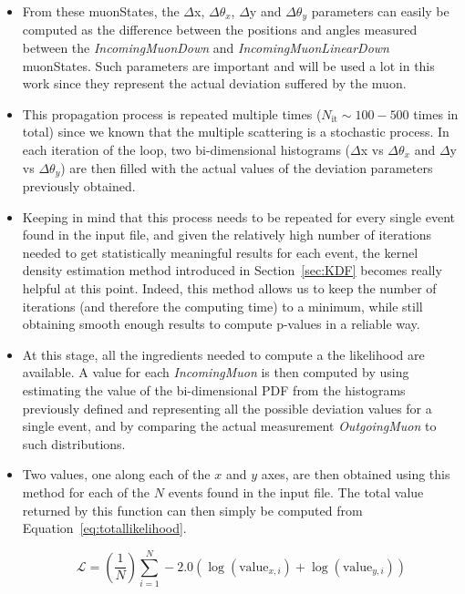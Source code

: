\documentclass[a4paper, 11pt, twoside, openright]{report}
\begin{document}
\begin{itemize}
\item From these muonStates, the $\Delta$x, $\Delta \theta_x$, $\Delta$y and $\Delta \theta_y$ parameters can easily be computed as the difference between the positions and angles measured between the \textit{IncomingMuonDown} and \textit{IncomingMuonLinearDown} muonStates. Such parameters are important and will be used a lot in this work since they represent the actual deviation suffered by the muon.
\item This propagation process is repeated multiple times ($N_{\text{it}} \sim 100-500$ times in total) since we known that the multiple scattering is a stochastic process. In each iteration of the loop, two bi-dimensional histograms ($\Delta$x vs $\Delta \theta_x$ and $\Delta$y vs $\Delta \theta_y$) are then filled with the actual values of the deviation parameters previously obtained.
\item Keeping in mind that this process needs to be repeated for every single event found in the input file, and given the relatively high number of iterations needed to get statistically meaningful results for each event, the kernel density estimation method introduced in Section~\ref{sec:KDF} becomes really helpful at this point. Indeed, this method allows us to keep the number of iterations (and therefore the computing time) to a minimum, while still obtaining smooth enough results to compute p-values in a reliable way.
\item At this stage, all the ingredients needed to compute a the likelihood are available. A value for each \textit{IncomingMuon} is then computed by using estimating the value of the bi-dimensional PDF from the histograms previously defined and representing all the possible deviation values for a single event, and by comparing the actual measurement \textit{OutgoingMuon} to such distributions.
\item Two values, one along each of the $x$ and $y$ axes, are then obtained using this method for each of the $N$ events found in the input file. The total value returned by this function can then simply be computed from Equation~\ref{eq:totallikelihood}.

\begin{equation}
\label{eq:totallikelihood}
\mathcal{L} = \left( \frac{1}{N} \right) \sum_{i = 1}^N -2.0 \left ( \log(\text{value}_{x, i}) + \log(\text{value}_{y, i}) \right)
\end{equation}



\end{itemize}
\end{document}
